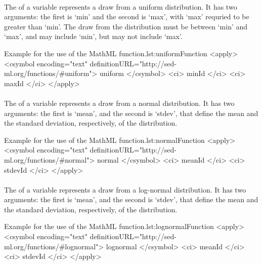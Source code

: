 \paragraph*{}
\label{fun:uniform}
The \uniform of a variable represents a draw from a uniform distribution.  It has two arguments:  the first is `min' and the second is `max', with `max' requried to be greater than `min'.  The draw from the distribution must be between `min' and `max', and may include `min', but may not include `max'.
\begin{myXmlLst}{Example for the use of the MathML  function.}{lst:uniformFunction}
<apply>
 	<csymbol encoding="text" definitionURL="http://sed-ml.org/functions/#uniform">
 		uniform
 	</csymbol>
 	<ci> minId </ci>
 	<ci> maxId </ci>
</apply>
\end{myXmlLst}


\paragraph*{}
\label{fun:normal}
The \normal of a variable represents a draw from a normal distribution.  It has two arguments:  the first is `mean', and the second is `stdev', that define the mean and the standard deviation, respectively, of the distribution.
\begin{myXmlLst}{Example for the use of the MathML  function.}{lst:normalFunction}
<apply>
 	<csymbol encoding="text" definitionURL="http://sed-ml.org/functions/#normal">
 		normal
 	</csymbol>
 	<ci> meanId </ci>
 	<ci> stdevId </ci>
</apply>
\end{myXmlLst}


\paragraph*{}
\label{fun:lognormal}
The \lognormal of a variable represents a draw from a log-normal distribution.  It has two arguments:  the first is `mean', and the second is `stdev', that define the mean and the standard deviation, respectively, of the distribution.
\begin{myXmlLst}{Example for the use of the MathML  function.}{lst:lognormalFunction}
<apply>
 	<csymbol encoding="text" definitionURL="http://sed-ml.org/functions/#lognormal">
 		lognormal
 	</csymbol>
 	<ci> meanId </ci>
 	<ci> stdevId </ci>
</apply>
\end{myXmlLst}



